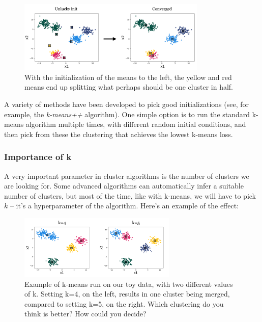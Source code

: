\documentclass[11pt]{article}
\begin{document}
\begin{figure}[h]
    \centering
    \includegraphics[width=0.8\textwidth]{./figures/kmeans_init.png}
    \caption{With the initialization of the means to the left, the yellow and red means end up splitting what perhaps should be one cluster in half.}
    \label{fig:kmeans_init}
\end{figure}

A variety of methods have been developed to pick good initializations (see, for example, the \textit{k-means++} algorithm). One simple option is to run the standard k-means algorithm multiple times, with different random initial conditions, and then pick from these the clustering that achieves the lowest k-means loss.

\subsubsection{Importance of k}\label{sec:importance_of_k}
A very important parameter in cluster algorithms is the number of clusters we are looking for. Some advanced algorithms can automatically infer a suitable number of clusters, but most of the time, like with k-means, we will have to pick $k$ -- it's a hyperparameter of the algorithm. Here's an example of the effect:

\begin{figure}[h]
    \centering
    \includegraphics[width=0.67\textwidth]{figures/effect_of_k.png}
    \caption{Example of k-means run on our toy data, with two different values of k. Setting k=4, on the left, results in one cluster being merged, compared to setting k=5, on the right. Which clustering do you think is better? How could you decide?}
    \label{fig:effect_of_k}
\end{figure}
\end{document}
